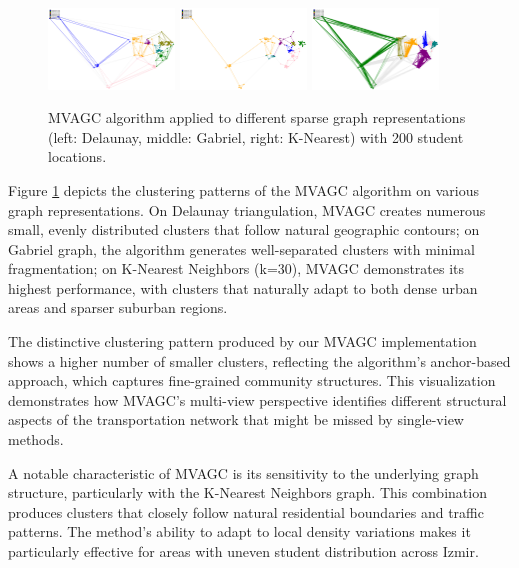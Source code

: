 \begin{figure}[htbp]
\centering
\includegraphics[width=0.3\textwidth]{./img/MVAGC_Delaunay}
\hspace{0.2cm}
\includegraphics[width=0.3\textwidth]{./img/MVAGC_Gabriel}
\hspace{0.2cm}
\includegraphics[width=0.3\textwidth]{./img/MVAGC_K}

\caption{MVAGC algorithm applied to different sparse graph representations (left: Delaunay, middle: Gabriel, right: K-Nearest) with 200 student locations.}
\label{fig:mvagc_clustering}
\end{figure}

Figure \ref{fig:mvagc_clustering} depicts the clustering patterns of the MVAGC algorithm on various graph representations. On Delaunay triangulation, MVAGC creates numerous small, evenly distributed clusters that follow natural geographic contours; on Gabriel graph, the algorithm generates well-separated clusters with minimal fragmentation; on K-Nearest Neighbors (k=30), MVAGC demonstrates its highest performance, with clusters that naturally adapt to both dense urban areas and sparser suburban regions.

The distinctive clustering pattern produced by our MVAGC implementation shows a higher number of smaller clusters, reflecting the algorithm's anchor-based approach, which captures fine-grained community structures. This visualization demonstrates how MVAGC's multi-view perspective identifies different structural aspects of the transportation network that might be missed by single-view methods.

A notable characteristic of MVAGC is its sensitivity to the underlying graph structure, particularly with the K-Nearest Neighbors graph. This combination produces clusters that closely follow natural residential boundaries and traffic patterns. The method's ability to adapt to local density variations makes it particularly effective for areas with uneven student distribution across Izmir.

